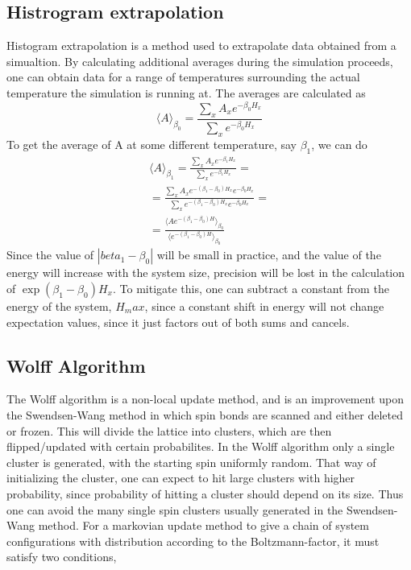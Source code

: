 \subsection{Histrogram extrapolation}
Histogram extrapolation is a method used to extrapolate data obtained from a simualtion.
By calculating additional averages during the simulation proceeds, one can obtain data for a range of temperatures surrounding the actual temperature the simulation is running at.
The averages are calculated as
\begin{equation}
  \langle A \rangle_{\beta_0} =  \frac{\sum_{x}A_x e^{-\beta_0 H_x}}{\sum_{x}e^{-\beta_0 H_x}}
\end{equation}
To get the average of A at some different temperature, say $\beta_1$, we can do
\begin{align}
  \langle A\rangle_{\beta_1} =  \frac{\sum_{x}A_x e^{-\beta_1 H_x}}{\sum_{x}e^{-\beta_1 H_x}} = \\
  = \frac{\sum_x A_x e^{-(\beta_1 - \beta_0)H_x} e^{-\beta_0 H_x}}{\sum_x e^{-(\beta_1 - \beta_0)H_x}e^{-\beta_0 H_x}} = \\
  = \frac{\langle A e^{-(\beta_1 - \beta_0)H}\rangle_{\beta_0}}{\langle e^{-(\beta_1 - \beta_0)H}\rangle_{\beta_0}}
\end{align}
Since the value of $|beta_1 -\beta_0|$ will be small in practice, and the value of the energy will increase with the system size, precision will be lost in the calculation of $\exp\left( \beta_1 - \beta_0 \right)H_x$. To mitigate this, one can subtract a constant from the energy of the system, $H_max$, since a constant shift in energy will not change expectation values, since it just factors out of both sums and cancels.
\subsection{Wolff Algorithm}
The Wolff algorithm is a non-local update method, and is an improvement upon the Swendsen-Wang method in which spin bonds are scanned and either deleted or frozen. This will divide the lattice into clusters, which are then flipped/updated with certain probabilites. In the Wolff algorithm only a single cluster is generated, with the starting spin uniformly random. That way of initializing the cluster, one can expect to hit large clusters with higher probability, since probability of hitting a cluster should depend on its size.
Thus one can avoid the many single spin clusters usually generated in the Swendsen-Wang method.
For a markovian update method to give a chain of system configurations with distribution according to the Boltzmann-factor, it must satisfy two conditions, 

